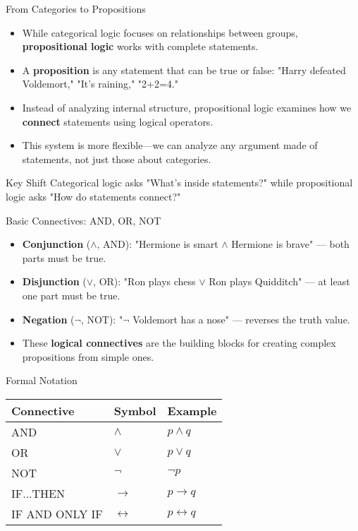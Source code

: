 \documentclass{beamer}
\begin{document}
	
	\begin{frame}{From Categories to Propositions}
		\begin{itemize}
			\item While categorical logic focuses on relationships between groups, \textbf{propositional logic} works with complete statements.
			\item A \textbf{proposition} is any statement that can be true or false: "Harry defeated Voldemort," "It's raining," "2+2=4."
			\item Instead of analyzing internal structure, propositional logic examines how we \textbf{connect} statements using logical operators.
			\item This system is more flexible—we can analyze any argument made of statements, not just those about categories.
		\end{itemize}
		
		\begin{alertblock}{Key Shift}
			Categorical logic asks "What's inside statements?" while propositional logic asks "How do statements connect?"
		\end{alertblock}
	\end{frame}
		\begin{frame}{Basic Connectives: AND, OR, NOT}
		\begin{itemize}
			\item \textbf{Conjunction} ($\wedge$, AND): "Hermione is smart $\wedge$ Hermione is brave" — both parts must be true.
			\item \textbf{Disjunction} ($\vee$, OR): "Ron plays chess $\vee$ Ron plays Quidditch" — at least one part must be true.
			\item \textbf{Negation} ($\neg$, NOT): "$\neg$ Voldemort has a nose" — reverses the truth value.
			\item These \textbf{logical connectives} are the building blocks for creating complex propositions from simple ones.
		\end{itemize}
		
		\begin{block}{Formal Notation}
			\begin{tabular}{lll}
				\textbf{Connective} & \textbf{Symbol} & \textbf{Example} \\
				\hline
				AND & $\wedge$ & $p \wedge q$ \\
				OR & $\vee$ & $p \vee q$ \\
				NOT & $\neg$ & $\neg p$ \\
				IF...THEN & $\rightarrow$ & $p \rightarrow q$ \\
				IF AND ONLY IF & $\leftrightarrow$ & $p \leftrightarrow q$
			\end{tabular}
		\end{block}
	\end{frame}
	
\end{document}

